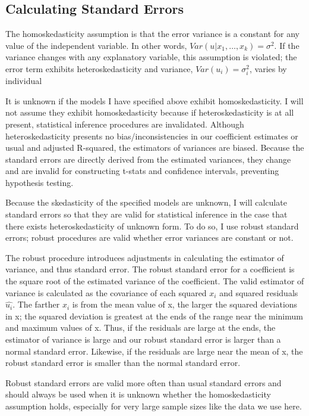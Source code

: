 \documentclass[a4paper]{article}
\begin{document}
\subsection{Calculating Standard Errors}
The homoskedasticity assumption is that the error variance is a constant for any value of the independent variable. In other words, $Var(u|x_1, …, x_k) = \sigma^{2}$. If the variance changes with any explanatory variable, this assumption is violated; the error term exhibits heteroskedasticity and variance, $Var(u_i) = \sigma_{i}^{2}$, varies by individual

It is unknown if the models I have specified above exhibit homoskedasticity. I will not assume they exhibit homoskedasticity because if heteroskedasticity is at all present, statistical inference procedures are invalidated. Although heteroskedasticity presents no bias/inconsistencies in our coefficient estimates or usual and adjusted R-squared, the estimators of variances are biased. Because the standard errors are directly derived from the estimated variances, they change and are invalid for constructing t-stats and confidence intervals, preventing hypothesis testing. 

Because the skedasticity of the specified models are unknown, I will calculate standard errors so that they are valid for statistical inference in the case that there exists heteroskedasticity of unknown form. To do so, I use robust standard errors; robust procedures are valid whether error variances are constant or not. 

The robust procedure introduces adjustments in calculating the estimator of variance, and thus standard error. The robust standard error for a coefficient is the square root of the estimated variance of the coefficient. The valid estimator of variance is calculated as the covariance of each squared $x_i$ and squared residuals $\hat{u_i}$. The farther $x_i$ is from the mean value of x, the larger the squared deviations in x; the squared deviation is greatest at the ends of the range near the minimum and maximum values of x. Thus, if the residuals are large at the ends, the estimator of variance is large and our robust standard error is larger than a normal standard error. Likewise, if the residuals are large near the mean of x, the robust standard error is smaller than the normal standard error.

Robust standard errors are valid more often than usual standard errors and should always be used when it is unknown whether the homoskedasticity assumption holds, especially for very large sample sizes like the data we use here.
\end{document}
